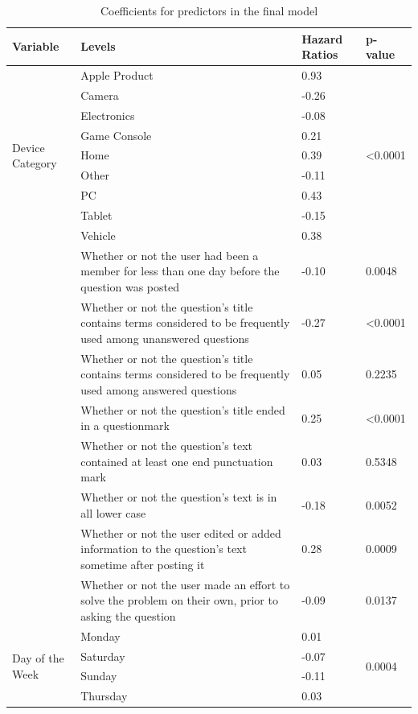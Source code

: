 \documentclass{article}
\begin{document}
\begin{table}[ht]
\centering
\caption{Coefficients for predictors in the final model} 
\begin{tabular}{|p{1.5cm}|p{6cm}|p{2.5cm}|p{2.5cm}|}
  \hline
 Variable &  Levels & Hazard Ratios & p-value \\ 
  \hline
  \multirow{ 9 }{ 2 cm }{ Device Category } & Apple Product & 0.93 & \multirow{ 9 }{ 1.5cm }{ <0.0001 }\\ 
  & Camera & -0.26 & \\ 
  & Electronics & -0.08 &\\ 
  & Game Console & 0.21 &\\ 
  & Home & 0.39 &\\ 
  & Other & -0.11 &\\ 
  & PC & 0.43 &\\ 
  & Tablet & -0.15 &\\ 
  & Vehicle & 0.38 &\\
  \hline
  & Whether or not the user had been a member for less than one day before the question was posted & -0.10 & 0.0048 \\
  \hline
  & Whether or not the question's title contains terms considered to be frequently used among unanswered questions & -0.27 & <0.0001 \\ 
  \hline
  & Whether or not the question's title contains terms considered to be frequently used among answered questions & 0.05 & 0.2235\\ 
  \hline
  & Whether or not the question's title ended in a questionmark & 0.25 & <0.0001\\ 
  \hline
  & Whether or not the question's text contained at least one end punctuation mark & 0.03 & 0.5348\\ 
  \hline
  & Whether or not the question's text is in all lower case & -0.18 & 0.0052 \\ 
  \hline
  & Whether or not the user edited or added information to the question's text sometime after posting it & 0.28 & 0.0009 \\ 
  \hline
  & Whether or not the user made an effort to solve the problem on their own, prior to asking the question & -0.09 & 0.0137 \\ 
  \hline
  \multirow{ 6 }{ 2 cm }{ Day of the Week } & Monday & 0.01 & \multirow{ 6 }{ 1.5cm }{ 0.0004 }\\ 
  & Saturday & -0.07 & \\ 
  & Sunday & -0.11 & \\ 
  & Thursday & 0.03 & \\ 

\end{tabular}
\end{table}
\end{document}

